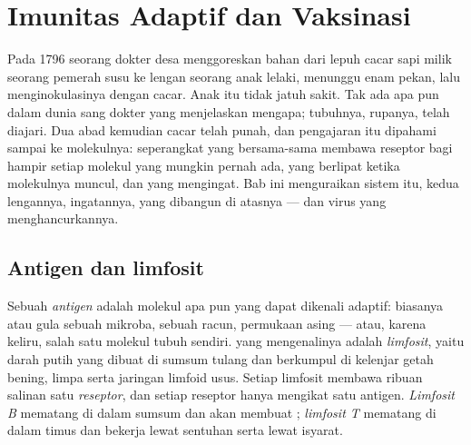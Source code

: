 \chapter{Imunitas Adaptif dan Vaksinasi}\label{ch:g12:adaptive-immunity}

Pada 1796 seorang dokter desa menggoreskan bahan dari lepuh cacar sapi
milik seorang pemerah susu ke lengan seorang anak lelaki, menunggu enam
pekan, lalu menginokulasinya dengan cacar. Anak itu tidak jatuh sakit.
Tak ada apa pun dalam dunia sang dokter yang menjelaskan mengapa;
tubuhnya, rupanya, telah diajari. Dua abad kemudian cacar telah punah,
dan pengajaran itu dipahami sampai ke molekulnya: seperangkat  yang
bersama-sama membawa reseptor bagi hampir setiap molekul yang mungkin
pernah ada, yang berlipat ketika molekulnya muncul, dan yang
mengingat. Bab ini menguraikan sistem itu, kedua lengannya, ingatannya,
 yang dibangun di atasnya --- dan virus yang menghancurkannya.

\section{Antigen dan limfosit}

\begin{definition}\label{def:g12:adaptive-immunity:antigen}
Sebuah \emph{antigen} adalah molekul apa pun yang dapat
dikenali  adaptif: biasanya  atau gula sebuah
mikroba, sebuah racun, permukaan  asing --- atau, karena keliru,
salah satu molekul tubuh sendiri.  yang mengenalinya adalah
\emph{limfosit}, yaitu  darah putih yang dibuat di
sumsum tulang dan berkumpul di kelenjar getah bening, limpa serta
jaringan limfoid usus. Setiap limfosit membawa ribuan salinan satu
\emph{reseptor}, dan setiap reseptor hanya mengikat satu antigen.
\emph{Limfosit B} mematang di dalam sumsum dan akan membuat ;
\emph{limfosit T} mematang di dalam timus dan bekerja lewat sentuhan
serta lewat isyarat.
\end{definition}

